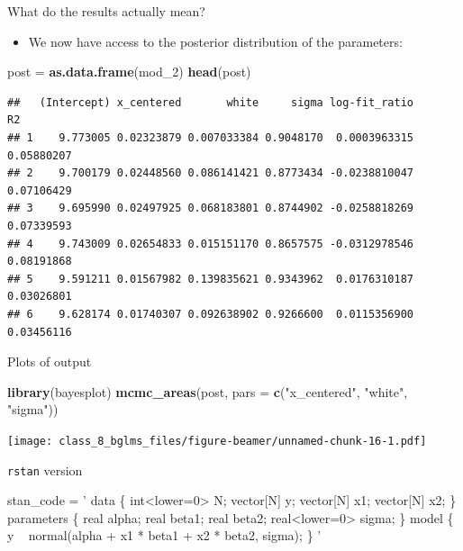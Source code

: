 \documentclass[ignorenonframetext,]{beamer}
\newenvironment{Shaded}{\begin{snugshade}}{\end{snugshade}}
\newcommand{\KeywordTok}[1]{\textcolor[rgb]{0.13,0.29,0.53}{\textbf{#1}}}
\newcommand{\DataTypeTok}[1]{\textcolor[rgb]{0.13,0.29,0.53}{#1}}
\newcommand{\DecValTok}[1]{\textcolor[rgb]{0.00,0.00,0.81}{#1}}
\newcommand{\StringTok}[1]{\textcolor[rgb]{0.31,0.60,0.02}{#1}}
\newcommand{\NormalTok}[1]{#1}
\providecommand{\tightlist}{%
  \setlength{\itemsep}{0pt}\setlength{\parskip}{0pt}}
\begin{document}
\begin{frame}[fragile]{What do the results actually mean?}

\begin{itemize}
\tightlist
\item
  We now have access to the posterior distribution of the parameters:
\end{itemize}

\begin{Shaded}
\begin{Highlighting}[]
\NormalTok{post =}\StringTok{ }\KeywordTok{as.data.frame}\NormalTok{(mod_}\DecValTok{2}\NormalTok{)}
\KeywordTok{head}\NormalTok{(post)}
\end{Highlighting}
\end{Shaded}

\begin{verbatim}
##   (Intercept) x_centered       white     sigma log-fit_ratio         R2
## 1    9.773005 0.02323879 0.007033384 0.9048170  0.0003963315 0.05880207
## 2    9.700179 0.02448560 0.086141421 0.8773434 -0.0238810047 0.07106429
## 3    9.695990 0.02497925 0.068183801 0.8744902 -0.0258818269 0.07339593
## 4    9.743009 0.02654833 0.015151170 0.8657575 -0.0312978546 0.08191868
## 5    9.591211 0.01567982 0.139835621 0.9343962  0.0176310187 0.03026801
## 6    9.628174 0.01740307 0.092638902 0.9266600  0.0115356900 0.03456116
\end{verbatim}

\end{frame}

\begin{frame}[fragile]{Plots of output}

\begin{Shaded}
\begin{Highlighting}[]
\KeywordTok{library}\NormalTok{(bayesplot)}
\KeywordTok{mcmc_areas}\NormalTok{(post,}
           \DataTypeTok{pars =} \KeywordTok{c}\NormalTok{(}\StringTok{"x_centered"}\NormalTok{, }\StringTok{"white"}\NormalTok{, }\StringTok{"sigma"}\NormalTok{))}
\end{Highlighting}
\end{Shaded}

\texttt{[image: class\_8\_bglms\_files/figure-beamer/unnamed-chunk-16-1.pdf]}

\end{frame}

\begin{frame}[fragile]{\texttt{rstan} version}

\begin{Shaded}
\begin{Highlighting}[]
\NormalTok{stan_code =}\StringTok{ '}
\StringTok{data \{}
\StringTok{  int<lower=0> N;}
\StringTok{  vector[N] y;}
\StringTok{  vector[N] x1;}
\StringTok{  vector[N] x2;}
\StringTok{\}}
\StringTok{parameters \{}
\StringTok{  real alpha;}
\StringTok{  real beta1;}
\StringTok{  real beta2;}
\StringTok{  real<lower=0> sigma;}
\StringTok{\}}
\StringTok{model \{}
\StringTok{  y ~ normal(alpha + x1 * beta1  + x2 * beta2, sigma);}
\StringTok{\}}
\StringTok{'}
\end{Highlighting}
\end{Shaded}

\end{frame}
\end{document}

